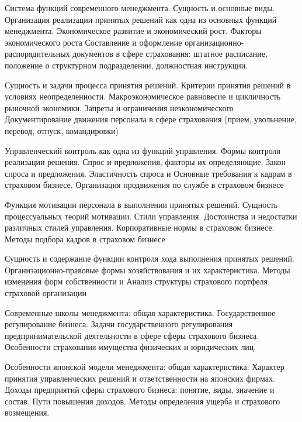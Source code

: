 \documentclass[
	11pt,
	a4paper,
	]
	{article}
\begin{document}
\bigskip

\noindent{} 
	{
		Система функций современного менеджмента. Сущность и основные виды. Организация реализации принятых решений как одна из основных функций менеджмента.
	}{
		Экономическое развитие и экономический рост. Факторы экономического роста
	}{
		Составление и оформление организационно-распорядительных документов в сфере страхования: штатное расписание, положение о структурном подразделении, должностная инструкции.
	}

\bigskip

\noindent{} 
	{
		Сущность и задачи процесса принятия решений. Критерии принятия решений в условиях неопределенности.
	}{
		Макроэкономическое равновесие и цикличность рыночной экономики. Запреты и ограничения неэкономического
	}{
		Документирование движения персонала в сфере страхования (прием, увольнение, перевод, отпуск, командировки)
	}

\bigskip

\noindent{} 
	{
		Управленческий контроль как одна из функций управления. Формы контроля реализации решения.
	}{
		Спрос и предложения, факторы их определяющие. Закон спроса и предложения. Эластичность спроса и
	}{
		Основные требования к кадрам в страховом бизнесе. Организация продвижения по службе в страховом бизнесе
	}

\bigskip

\noindent{} 
	{
		Функция мотивации персонала в выполнении принятых решений. Сущность процессуальных теорий мотивации.
	}{
		Стили управления. Достоинства и недостатки различных стилей управления.
	}{
		Корпоративные нормы в страховом бизнесе. Методы подбора кадров в страховом бизнесе
	}

\bigskip

\noindent{} 
	{
		Сущность и содержание функции контроля хода выполнения принятых решений.
	}{
		Организационно-правовые формы хозяйствования и их характеристика. Методы изменения форм собственности и
	}{
		Анализ структуры страхового портфеля страховой организации
	}

\bigskip

\noindent{} 
	{
		Современные школы менеджмента: общая характеристика.
	}{
		Государственное регулирование бизнеса. Задачи государственного регулирования предпринимательской деятельности в сфере сферы страхового бизнеса.
	}{
		Особенности страхования имущества физических и юридических лиц.
	}

\bigskip

\noindent{} 
	{
		Особенности японской модели менеджмента: общая характеристика. Характер принятия управленческих решений и ответственности на японских фирмах.
	}{
		Доходы предприятий сферы страхового бизнеса: понятие, виды, значение и состав. Пути повышения доходов.
	}{
		Методы определения ущерба и страхового возмещения.
	}
\end{document}
